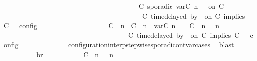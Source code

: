 \begin{isabellebody}
\ \ \ \ \ \ \ \ \ \ \ \ \ \ \ \ \ \ \ \ \ \ \ \ \ \ \ \ \ \ \ \ \ \ \ \ \ \ {\isasymtriangleright}\ {\isacharparenleft}{\isacharparenleft}C\ sporadic{\isasymsharp}\ {\isasymlparr}{\isasymtau}\isactrlsub v\isactrlsub a\isactrlsub r{\isacharparenleft}C\ n{\isacharparenright}\ {\isasymoplus}\ {\isasymdelta}{\isasymtau}{\isasymrparr}\ on\ C\isanewline
\ \ \ \ \ \ \ \ \ \ \ \ \ \ \ \ \ \ \ \ \ \ \ \ \ \ \ \ \ \ \ \ \ \ \ \ \ \ \ {\isacharhash}\ {\isacharparenleft}C\ time{\isacharminus}delayed{\isasymbowtie}\ by\ {\isasymdelta}{\isasymtau}\ on\ C\ implies\ C\ {\isacharhash}\ {\isasymPhi}{\isacharparenright}\ {\isasymrbrakk}\isactrlsub c\isactrlsub o\isactrlsub n\isactrlsub f\isactrlsub i\isactrlsub g\isanewline
\ \ \ \ \ \ \ \ \ \ \ \ \ \ \ \ \ \ {\isasymunion}\ {\isasymlbrakk}\ {\isacharparenleft}{\isacharparenleft}C\ {\isasymUp}\ n{\isacharparenright}\ {\isacharhash}\ {\isacharparenleft}C\ {\isasymDown}\ n\ {\isacharat}{\isasymsharp}\ {\isasymlparr}{\isasymtau}\isactrlsub v\isactrlsub a\isactrlsub r{\isacharparenleft}C\ n{\isacharparenright}\ {\isasymoplus}\ {\isasymdelta}{\isasymtau}{\isasymrparr}{\isacharparenright}\ {\isacharhash}\ {\isacharparenleft}C\ {\isasymUp}\ n{\isacharparenright}\ {\isacharhash}\ {\isasymGamma}{\isacharparenright}{\isacharcomma}\ n\isanewline
\ \ \ \ \ \ \ \ \ \ \ \ \ \ \ \ \ \ \ \ \ \ \ \ \ \ \ \ \ \ \ \ \ {\isasymturnstile}\ {\isasymPsi}\ {\isasymtriangleright}\ {\isacharparenleft}{\isacharparenleft}C\ time{\isacharminus}delayed{\isasymbowtie}\ by\ {\isasymdelta}{\isasymtau}\ on\ C\ implies\ C\ {\isacharhash}\ {\isasymPhi}{\isacharparenright}\ {\isasymrbrakk}\isactrlsub c\isactrlsub o\isactrlsub n\isactrlsub f\isactrlsub i\isactrlsub g{\isacartoucheclose}\isanewline
\ \ \ \ \ \ \ \ \ \ \ \ \isamarkupfalse%
\ configuration{\isacharunderscore}interp{\isacharunderscore}stepwise{\isacharunderscore}sporadicon{\isacharunderscore}tvar{\isacharunderscore}cases\ \isamarkupfalse%
\ blast\isanewline
\ \ \ \ \ \ \isamarkupfalse%
\ \isamarkupfalse%
\ br{}{\isacharcolon}\isanewline
\ \ \ \ \ \ \ \ {\isacartoucheopen}{\isasymrho}\ {\isasymin}\ {\isasymlbrakk}\ {\isacharparenleft}{\isacharparenleft}C\ {\isasymnot}{\isasymUp}\ n{\isacharparenright}\ {\isacharhash}\ {\isasymGamma}{\isacharparenright}{\isacharcomma}\ n\isanewline

\end{isabellebody}
